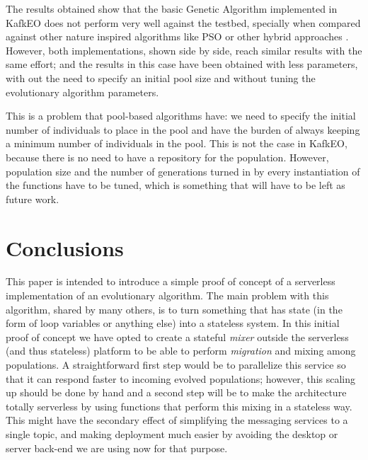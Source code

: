 \documentclass[sigconf]{acmart}
\begin{document}
The results obtained show that the basic Genetic Algorithm implemented
in KafkEO does not perform
very well against the testbed, specially when compared against other nature
inspired algorithms like PSO or other hybrid approaches \cite{hansen2010bbob}.
However, both implementations, shown side by side, reach similar results with the same
effort; and the results in this case have been obtained with less
parameters, with out the need to specify an initial pool size and
without tuning the evolutionary algorithm parameters.

This is a problem that pool-based algorithms have: we need to
specify the initial number of individuals to place in the pool and have the
burden of always keeping a minimum number of individuals in the pool. This
is not the case in KafkEO, because there is no need to have a
repository for the population. However, population size and the number
of generations turned in by every instantiation of the functions have
to be tuned, which is something that will have to be left as future
work.


\section{Conclusions}
\label{sec:con}

This paper is intended to introduce a simple proof of concept of a
serverless implementation of an evolutionary algorithm. The main
problem with this algorithm, shared by many others, is to turn
something that has state (in the form of loop variables or anything
else) into a stateless system. In this initial proof of concept we have
opted to create a stateful {\em mixer} outside the serverless (and
thus stateless) platform to be able to perform {\em
  migration} and mixing among populations. A straightforward first step
would be to parallelize this service so that it can respond faster to
incoming evolved populations; however, this scaling up should be done
by hand and a second step will be to make the architecture totally
serverless by using functions that perform this mixing in a stateless
way. This might have the secondary effect of simplifying the messaging
services to a single topic, and making deployment much easier by
avoiding the desktop or server back-end we are using now for that
purpose.
\end{document}
